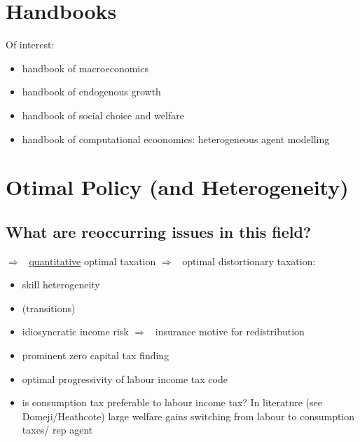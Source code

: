 \documentclass[12pt]{article}
\newcommand{\ar}{$\Rightarrow$ \ }
\begin{document}
\section{Handbooks}
Of interest:
\begin{itemize}
\item handbook of macroeconomics
\item handbook of endogenous growth
\item handbook of social choice and welfare
\item handbook of computational ecoonomics: heterogeneous agent modelling 
\end{itemize}
\section{Otimal Policy (and Heterogeneity)}
\hypertarget{opt}{}
\localtableofcontents

\subsection{What are reoccurring issues in this field?}\ar \underline{quantitative} optimal taxation \ar optimal distortionary taxation:
\begin{itemize}
	\item skill heterogeneity 
	\item (transitions)
	\item idiosyncratic income risk \ar insurance motive for redistribution
	\item prominent zero capital tax finding
	\item optimal progressivity of labour income tax code
	\item is consumption tax preferable to labour income tax? In literature (see Domeji/Heathcote) large welfare gains switching from labour to consumption taxes/ rep agent
\end{itemize}


\subsection{ \citet*{Heathcote2017OptimalFramework}}
\end{document}
